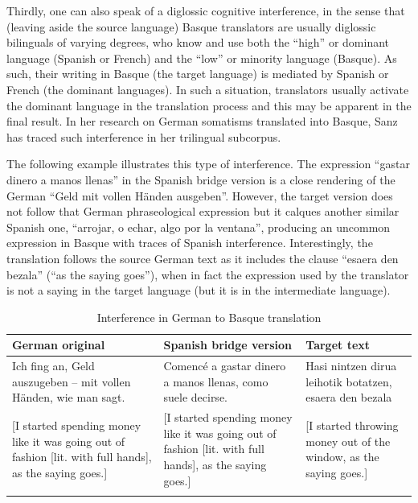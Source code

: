 \documentclass[output=paper]{LSP/langsci}
\begin{document}
Thirdly, one can also speak of a diglossic cognitive interference, in the sense that (leaving aside the source language) Basque translators are usually diglossic bilinguals of varying degrees, who know and use both the “high” or dominant language (Spanish or French) and the “low” or minority language (Basque). As such, their writing in Basque (the target language) is mediated by Spanish or French (the dominant languages). In such a situation, translators usually activate the dominant language in the translation process and this may be apparent in the final result. In her research on German somatisms translated into Basque, Sanz has traced such interference in her trilingual subcorpus.

The following example illustrates this type of interference. The expression “gastar dinero a manos llenas” in the Spanish bridge version is a close rendering of the German “Geld mit  vollen Händen ausgeben”. However, the target version does not follow that German phraseological expression but it calques another similar Spanish one, “arrojar, o echar, algo por la ventana”, producing an uncommon expression in Basque with traces of Spanish interference. Interestingly, the translation follows the source German text as it includes the clause “esaera den bezala” (“as the saying goes”), when in fact the expression used by the translator is not a saying in the target language (but it is in the intermediate language).

\begin{table}
     \centering
     \begin{tabularx}{\textwidth}{XXX}
     \lsptoprule
German original    & Spanish bridge version  & Target text  \\ 
\midrule
Ich fing an, Geld auszugeben -- mit vollen Händen, wie man sagt.   &  Comencé a gastar dinero a manos llenas, como suele decirse.   &  Hasi nintzen dirua leihotik botatzen, esaera den bezala  \\ 
{[}I started spending money like it was going out of fashion {[}lit. with full hands{]}, as the saying goes.{]} & {[}I started spending money like it was going out of fashion {[}lit. with full hands{]}, as the saying goes.{]}  & {[}I started throwing money out of the window, as the saying goes.{]}  \\

     \lspbottomrule
     \end{tabularx}

 \caption{Interference in German to Basque translation}
     \label{tab:3.1}
\end{table}
\end{document}
